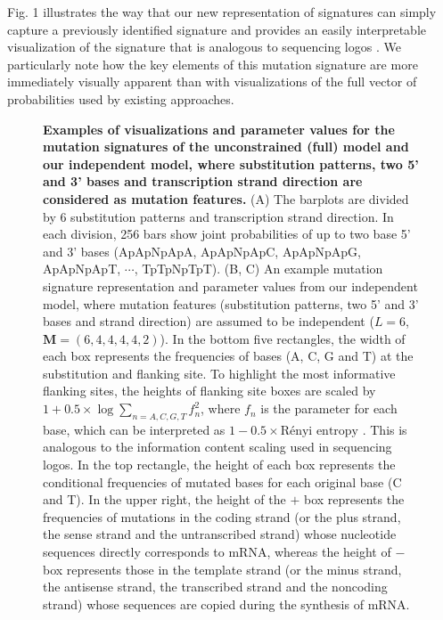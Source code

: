 \documentclass[10pt,letterpaper]{article}
\begin{document}
Fig. 1 illustrates the way that our new representation of signatures can simply capture
a previously identified signature \cite{pmid25362482, pmid23318258} and provides
an easily interpretable visualization of the signature 
that is analogous to  sequencing logos \cite{pmid2172928}.
We particularly note how the key elements of this mutation signature are more immediately visually apparent than with visualizations of the full vector of probabilities used by existing approaches.

\begin{figure}[h]

\caption{{\bf Examples of visualizations and parameter values for the mutation signatures of the unconstrained (full) model and our independent model, 
where substitution patterns, two 5' and 3' bases and transcription strand direction are considered as mutation features.}
(A) The barplots are divided by 6 substitution patterns and transcription strand direction.
In each division, 256 bars show joint probabilities of up to two base 5' and 3' bases
(ApApNpApA, ApApNpApC, ApApNpApG, ApApNpApT, $\cdots$, TpTpNpTpT).
(B, C) An example mutation signature representation and parameter values from our independent model, where mutation features (substitution patterns, two 5' and 3' bases and strand direction) 
are assumed to be independent ($L=6$, $\bm{M} = (6, 4, 4, 4, 4, 2)$).
In the bottom five rectangles, the width of each box represents the frequencies of bases (A, C, G and T) at the substitution and flanking site. 
To highlight the most informative flanking sites, the heights of flanking site boxes are scaled by 
$1 + 0.5 \times \log \sum_{n = A,C,G,T} f_n^2$, where $f_n$ is the parameter for each base, 
which can be interpreted as $1 - 0.5 \times \text{R\'enyi entropy}$ \cite{rrnyi1961measures}. This is analogous to the information content scaling used in sequencing logos.
In the top rectangle, the height of each box represents the conditional frequencies of mutated bases for each original base (C and T).
In the upper right, the height of the $+$ box represents the frequencies of mutations in the coding strand (or the plus strand, the sense strand and the untranscribed strand)
whose nucleotide sequences directly corresponds to mRNA, 
whereas the height of $-$ box represents those in the template strand (or the minus strand, the antisense strand, the transcribed strand and the noncoding strand)
whose sequences are copied during the synthesis of mRNA.
}
\label{mutSig_example}

\end{figure}
\end{document}
